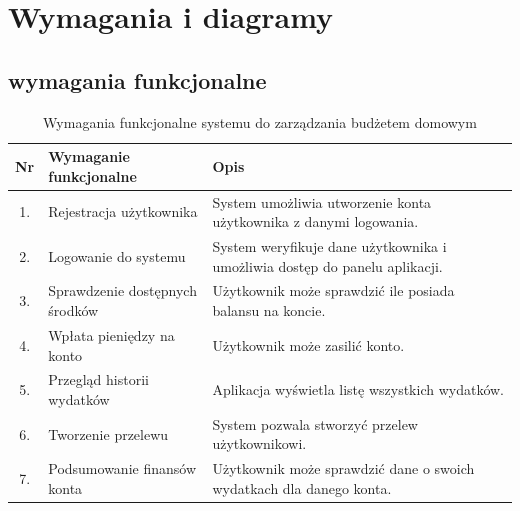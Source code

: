 \chapter{Wymagania i diagramy}

\section{wymagania funkcjonalne}
\begin{table}[!h]
	\centering
	\renewcommand{\arraystretch}{1.3}
	\setlength{\tabcolsep}{6pt}
	\begin{tabular}{|c|p{5cm}|p{8cm}|}
		\hline
		\textbf{Nr} & \textbf{Wymaganie funkcjonalne} & \textbf{Opis} \\ \hline
		
		1. & Rejestracja użytkownika & System umożliwia utworzenie konta użytkownika z danymi logowania. \\ \hline
		2. & Logowanie do systemu & System weryfikuje dane użytkownika i umożliwia dostęp do panelu aplikacji. \\ \hline
		3. & Sprawdzenie dostępnych środków & Użytkownik może sprawdzić ile posiada balansu na koncie. \\ \hline
		4. & Wpłata pieniędzy na konto & Użytkownik może zasilić konto. \\ \hline
		5. & Przegląd historii wydatków & Aplikacja wyświetla listę wszystkich wydatków. \\ \hline
		6. & Tworzenie przelewu & System pozwala stworzyć przelew użytkownikowi. \\ \hline
		7. & Podsumowanie finansów konta & Użytkownik może sprawdzić dane o swoich wydatkach dla danego konta. \\ \hline
		
	\end{tabular}
	\caption{Wymagania funkcjonalne systemu do zarządzania budżetem domowym}
	\label{tab:wymagania_funkcjonalne}
\end{table}

